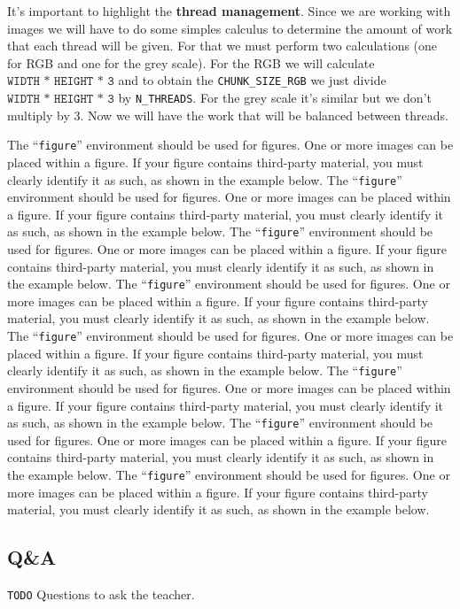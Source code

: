 \documentclass[sigconf]{acmart}
\begin{document}
  It's important to highlight the \textbf{thread management}. Since we are working with images we will have to do some simples calculus to determine the amount of work that
 each thread will be given. For that we must perform two calculations (one for RGB and one for the grey scale). For the RGB  we will calculate $\texttt{WIDTH * HEIGHT * 3}$ and to obtain the \texttt{CHUNK\_SIZE\_RGB} we just divide $\texttt{WIDTH * HEIGHT * 3}$  by \texttt{N\_THREADS}. For the grey scale it's similar but we don't multiply by 3. Now we will have the work that will be balanced between threads.

The ``\verb|figure|'' environment should be used for figures. One or
more images can be placed within a figure. If your figure contains
third-party material, you must clearly identify it as such, as shown
in the example below.
The ``\verb|figure|'' environment should be used for figures. One or
more images can be placed within a figure. If your figure contains
third-party material, you must clearly identify it as such, as shown
in the example below.
The ``\verb|figure|'' environment should be used for figures. One or
more images can be placed within a figure. If your figure contains
third-party material, you must clearly identify it as such, as shown
in the example below.
The ``\verb|figure|'' environment should be used for figures. One or
more images can be placed within a figure. If your figure contains
third-party material, you must clearly identify it as such, as shown
in the example below.
The ``\verb|figure|'' environment should be used for figures. One or
more images can be placed within a figure. If your figure contains
third-party material, you must clearly identify it as such, as shown
in the example below.
The ``\verb|figure|'' environment should be used for figures. One or
more images can be placed within a figure. If your figure contains
third-party material, you must clearly identify it as such, as shown
in the example below.
The ``\verb|figure|'' environment should be used for figures. One or
more images can be placed within a figure. If your figure contains
third-party material, you must clearly identify it as such, as shown
in the example below.
The ``\verb|figure|'' environment should be used for figures. One or
more images can be placed within a figure. If your figure contains
third-party material, you must clearly identify it as such, as shown
in the example below.

\subsection{\textbf{Q\&A}}
\texttt{TODO} Questions to ask the teacher.


\end{document}
